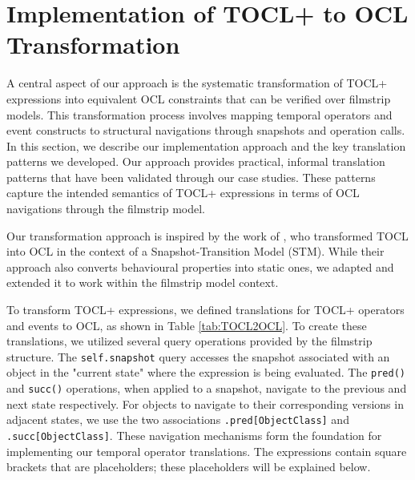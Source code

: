 \section{Implementation of TOCL+ to OCL Transformation}
\label{sec:translation}

\hspace{1cm} A central aspect of our approach is the systematic transformation of TOCL+ 
expressions into equivalent OCL constraints that can be verified over filmstrip 
models. This transformation process involves mapping temporal operators 
and event constructs to structural navigations through snapshots and operation calls. 
In this section, we describe our implementation approach and the key translation 
patterns we developed. Our approach provides practical, informal translation patterns 
that have been validated through our case studies. These patterns capture the intended 
semantics of TOCL+ expressions in terms of OCL navigations through the filmstrip model.

Our transformation approach is inspired by the work of \cite{TOCL2OCL}, who 
transformed TOCL \cite{TOCL} into OCL in the context of a Snapshot-Transition Model 
(STM). While their approach also converts behavioural properties into static ones, we 
adapted and extended it to work within the filmstrip model context.

To transform TOCL+ expressions, we defined translations for TOCL+ operators and 
events to OCL, as shown in Table \ref{tab:TOCL2OCL}. To create these translations, 
we utilized several query operations provided by the filmstrip structure. 
The \texttt{self.snapshot} query accesses the snapshot associated with an object in the 
"current state" where the expression is being evaluated. The \texttt{pred()} and \texttt{succ()} 
operations, when applied to a snapshot, navigate to the previous and next state 
respectively. For objects to navigate to their corresponding versions in adjacent 
states, we use the two associations \texttt{.pred[ObjectClass]} and \texttt{.succ[ObjectClass]}. These navigation mechanisms 
form the foundation for implementing our temporal operator translations.
The expressions contain square brackets that are placeholders; these placeholders
will be explained below.

